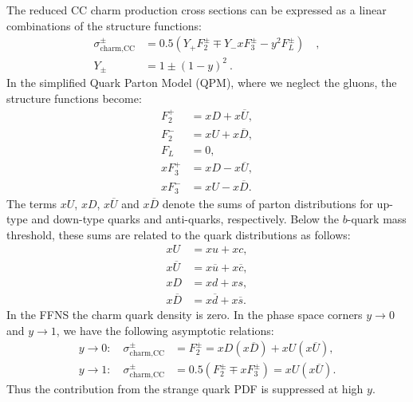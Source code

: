 \documentclass[pdftex,twocolumn,epjc3]{svjour3}          %
\begin{document}
The reduced CC charm production cross sections can be expressed as a
linear combinations of the structure functions:
\begin{equation}
\begin{split}
    \sigma^{\pm}_{\text{charm,CC}} &= 0.5(Y_{+}F_2^{\pm} \mp Y_{-}xF_3^{\pm} - y^2F_L^{\pm}) \quad ,\\[10pt]
    Y_{\pm} &= 1 \pm (1-y)^2 \ .
\end{split}
\end{equation}
In the simplified Quark Parton Model (QPM), where we neglect the  gluons, the structure functions become:
\begin{equation}
\begin{split}
    F_2^{+} &= xD + x\overline{U}, \\
    F_2^{-} &= xU + x\overline{D},\\
    F_L &= 0,\\
    xF_3^{+} &= xD - x\overline{U}, \\
    xF_3^{-} &= xU - x\overline{D}.
\end{split}
\end{equation}
The terms $xU$, $xD$, $x\overline{U}$ and $x\overline{D}$ denote the
sums of parton distributions for up-type and down-type quarks and
anti-quarks, respectively.  Below the $b$-quark mass threshold, these
sums are related to the quark distributions as follows:
\begin{equation}
\begin{split}
 xU &= xu + xc , \\
 x\overline{U} &= x\overline{u} + x\overline{c} , \\
 xD &= xd + xs , \\
 x\overline{D} &= x\overline{d} + x\overline{s}.
\end{split}
\end{equation}
In the FFNS the charm quark density is zero.
In the phase space corners $y \to 0$ and $y \to 1$, we have the following asymptotic relations:
\begin{equation}
\begin{split}
 y \to 0: \quad \sigma^{\pm}_{\text{charm,CC}} &= F_2^{\pm} = xD(x\overline{D}) + xU(x\overline{U}), \\[10pt]
 y \to 1: \quad \sigma^{\pm}_{\text{charm,CC}} &= 0.5(F_2^{\pm} \mp xF_3^{\pm}) = xU (x\overline{U}).
\label{eq:y01}
\end{split}
\end{equation}
Thus the contribution from the strange quark PDF is suppressed at high $y$.
\end{document}
